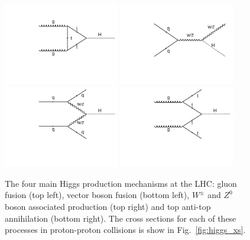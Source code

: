 \begin{figure}
  \includegraphics[width=0.45\textwidth]{theory/plots/ggh.pdf}
  \includegraphics[width=0.45\textwidth]{theory/plots/vh.pdf}\\
  \includegraphics[width=0.45\textwidth]{theory/plots/qqh.pdf}
  \includegraphics[width=0.45\textwidth]{theory/plots/tth.pdf}
  \caption[Feynman diagrams for \SM Higgs production at the \LHC]{The four main \SM Higgs production mechanisms at the LHC: gluon fusion (top left), vector boson fusion (bottom left), $W^{\pm}$ and $Z^{0}$ boson associated production (top right) and top anti-top annihilation (bottom right). The cross sections for each of these processes in proton-proton collisions is show in Fig.~\ref{fig:higgs_xs}.}
  \label{fig:feyn_prod}
\end{figure}

